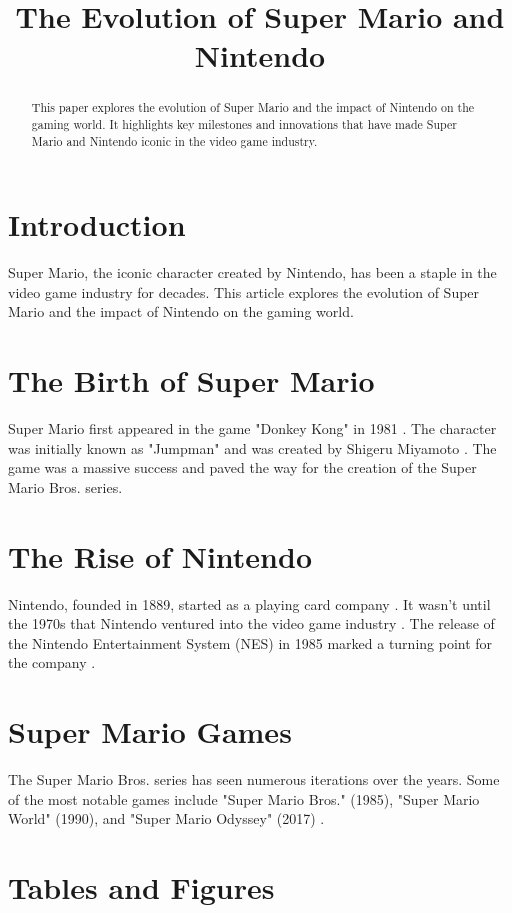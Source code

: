 \documentclass[conference]{IEEEtran}
\title{The Evolution of Super Mario and Nintendo}
\author{
  \IEEEauthorblockN{Your Name}
  \IEEEauthorblockA{Your Affiliation\\
  Your Address\\
  Email: your.email@example.com}
}
\begin{document}
\maketitle

\begin{abstract}
This paper explores the evolution of Super Mario and the impact of Nintendo on the gaming world. It highlights key milestones and innovations that have made Super Mario and Nintendo iconic in the video game industry.
\end{abstract}

\section{Introduction}
Super Mario, the iconic character created by Nintendo, has been a staple in the video game industry for decades. This article explores the evolution of Super Mario and the impact of Nintendo on the gaming world.

\section{The Birth of Super Mario}
Super Mario first appeared in the game "Donkey Kong" in 1981 \cite{ref1}. The character was initially known as "Jumpman" and was created by Shigeru Miyamoto \cite{ref2}. The game was a massive success and paved the way for the creation of the Super Mario Bros. series.

\section{The Rise of Nintendo}
Nintendo, founded in 1889, started as a playing card company \cite{ref3}. It wasn't until the 1970s that Nintendo ventured into the video game industry \cite{ref4}. The release of the Nintendo Entertainment System (NES) in 1985 marked a turning point for the company \cite{ref5}.

\section{Super Mario Games}
The Super Mario Bros. series has seen numerous iterations over the years. Some of the most notable games include "Super Mario Bros." (1985), "Super Mario World" (1990), and "Super Mario Odyssey" (2017) \cite{ref6, ref7, ref8}.

\section{Tables and Figures}
\end{document}
